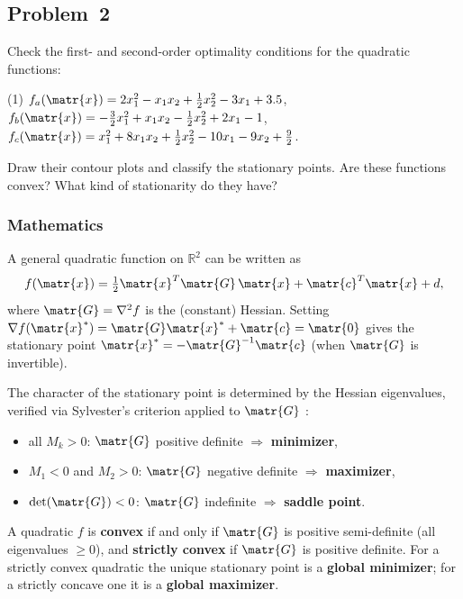\subsection{Problem~2}%
\label{problem:2}

Check the first- and second-order optimality conditions for the quadratic functions:
\begin{tasks}(1)
  \task $f_a(\matr{x}) = 2x_1^2 - x_1 x_2 + \tfrac{1}{2}x_2^2 - 3x_1 + 3.5$,
  \task $f_b(\matr{x}) = -\tfrac{3}{2}x_1^2 + x_1 x_2 - \tfrac{1}{2}x_2^2 + 2x_1 - 1$,
  \task $f_c(\matr{x}) = x_1^2 + 8x_1 x_2 + \tfrac{1}{2}x_2^2 - 10x_1 - 9x_2 + \tfrac{9}{2}$.
\end{tasks}
Draw their contour plots and classify the stationary points.
Are these functions convex? What kind of stationarity do they have?

\subsubsection*{Mathematics}

A general quadratic function on $\mathbb{R}^2$ can be written as
\begin{equation*}
  f(\matr{x}) = \tfrac{1}{2}\matr{x}^T \matr{G}\, \matr{x} + \matr{c}^T \matr{x} + d,
\end{equation*}
where $\matr{G} = \nabla^2 f$ is the (constant) Hessian.
Setting $\nabla f(\matr{x}^*) = \matr{G}\matr{x}^* + \matr{c} = \matr{0}$ gives the
stationary point $\matr{x}^* = -\matr{G}^{-1}\matr{c}$ (when $\matr{G}$ is invertible).

The character of the stationary point is determined by the Hessian eigenvalues, verified
via Sylvester's criterion applied to $\matr{G}$ \citep{Zdunek}:
\begin{itemize}
  \item all $M_k > 0$: $\matr{G}$ positive definite $\Rightarrow$ \textbf{minimizer},
  \item $M_1 < 0$ and $M_2 > 0$:
        $\matr{G}$ negative definite $\Rightarrow$ \textbf{maximizer},
  \item $\det(\matr{G}) < 0$: $\matr{G}$ indefinite $\Rightarrow$ \textbf{saddle point}.
\end{itemize}

A quadratic $f$ is \textbf{convex} if and only if $\matr{G}$ is positive semi-definite
(all eigenvalues $\geq 0$), and \textbf{strictly convex} if $\matr{G}$ is positive definite.
For a strictly convex quadratic the unique stationary point is a \textbf{global minimizer};
for a strictly concave one it is a \textbf{global maximizer}.

